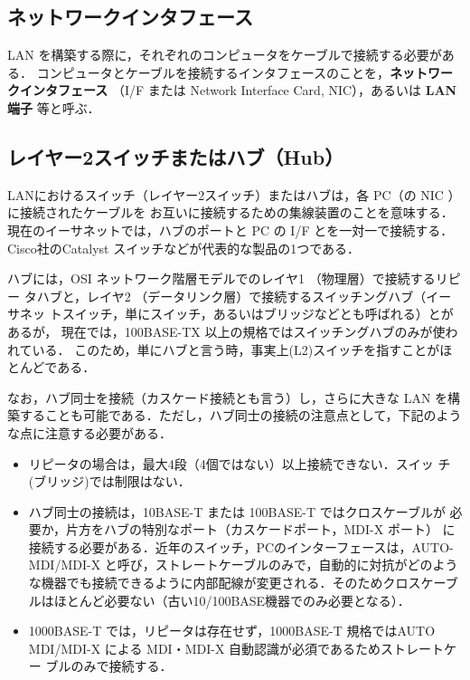 \subsection*{ネットワークインタフェース}
\label{subsec:02:nic} 
LAN を構築する際に，それぞれのコンピュータをケーブルで接続する必要がある．
 コンピュータとケーブルを接続するインタフェースのことを，{\bf ネットワークインタフェース} （I/F または Network
Interface Card, NIC），あるいは {\bf LAN 端子} 等と呼ぶ．

\subsection*{レイヤー2スイッチまたはハブ（Hub）}
\label{subsec:02:hub}
LANにおけるスイッチ（レイヤー2スイッチ）またはハブは，各 PC（の NIC ）に接続されたケーブルを
お互いに接続するための集線装置のことを意味する．
現在のイーサネットでは，ハブのポートと PC の I/F とを一対一で接続する．
Cisco社のCatalyst スイッチなどが代表的な製品の1つである．

ハブには，OSI ネットワーク階層モデルでのレイヤ1 （物理層）で接続するリピー
タハブと，レイヤ2 （データリンク層）で接続するスイッチングハブ（イーサネッ
トスイッチ，単にスイッチ，あるいはブリッジなどとも呼ばれる）とがあるが，
現在では，100BASE-TX 以上の規格ではスイッチングハブのみが使われている．
このため，単にハブと言う時，事実上(L2)スイッチを指すことがほとんどである．

なお，ハブ同士を接続（カスケード接続とも言う）し，さらに大きな LAN を構
築することも可能である．ただし，ハブ同士の接続の注意点として，下記のよう
な点に注意する必要がある．

\begin{itemize}
 \item リピータの場合は，最大4段（4個ではない）以上接続できない．スイッ
       チ(ブリッジ)では制限はない．
 \item ハブ同士の接続は，10BASE-T または 100BASE-T ではクロスケーブルが
       必要か，片方をハブの特別なポート（カスケードポート，MDI-X ポート）
       に接続する必要がある．近年のスイッチ，PCのインターフェースは，AUTO-MDI/MDI-X と呼び，ストレートケーブルのみで，自動的に対抗がどのような機器でも接続できるように内部配線が変更される．そのためクロスケーブルはほとんど必要ない（古い10/100BASE機器でのみ必要となる）．
 \item 1000BASE-T では，リピータは存在せず，1000BASE-T 規格ではAUTO
       MDI/MDI-X による MDI・MDI-X 自動認識が必須であるためストレートケー
       ブルのみで接続する．
\end{itemize}

